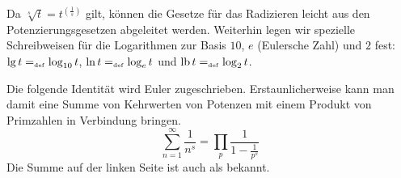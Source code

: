 Da $\sqrt[s]{t} = t^{\left(\frac{1}{s}\right)}$ gilt, können die Gesetze für das Radizieren leicht aus den Potenzierungsgesetzen abgeleitet werden.  Weiterhin legen wir spezielle Schreibweisen für die Logarithmen zur Basis $10$, $e$ (Eulersche Zahl) und $2$ fest: $\lg t =_{\mathrm{\scriptscriptstyle def}} \log_{10} t$, $\ln t =_{\mathrm{\scriptscriptstyle def}} \log_{e} t$ und $\mathrm{lb}\, t =_{\mathrm{\scriptscriptstyle def}} \log_{2} t$.

\begin{example}
Die folgende Identität wird Euler zugeschrieben. Erstaunlicherweise kann man damit eine Summe von Kehrwerten von Potenzen mit einem Produkt von Primzahlen in Verbindung bringen.
\begin{displaymath}
\sum_{n=1}^{\infty}{\frac{1}{n^s}} = \prod_{p} {\frac{1}{1 - \frac{1}{p^s}}}
\end{displaymath}
Die Summe auf der linken Seite ist auch als  bekannt.
\end{example}